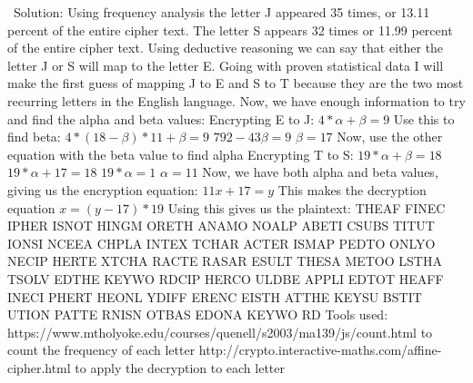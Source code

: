 \documentclass[12pt,letterpaper,final]{report}
\begin{document}
\indent\ Solution: Using frequency analysis the letter J appeared 35 times, or 13.11 percent of the entire cipher text. The letter S appears 32 times or 11.99 percent of the entire cipher text. Using deductive reasoning we can say that either the letter J or S will map to the letter E. Going with proven statistical data I will make the first guess of mapping J to E and S to T because they are the two most recurring letters in the English language. 
Now, we have enough information to try and find the alpha and beta values:
Encrypting E to J: $4*\alpha + \beta = 9$
Use this to find beta: $4*(18-\beta)*11+\beta = 9$
$792 -43\beta = 9$
$\beta = 17$
Now, use the other equation with the beta value to find alpha
Encrypting T to S: $19*\alpha + \beta = 18$
$19*\alpha + 17 = 18$
$19*\alpha = 1$
$\alpha = 11$
Now, we have  both alpha and beta values, giving us the encryption equation: $11x + 17 = y$ 
This makes the decryption equation $x = (y - 17)*19$
Using this gives us the plaintext:
THEAF FINEC IPHER ISNOT HINGM ORETH ANAMO NOALP ABETI CSUBS TITUT IONSI NCEEA CHPLA INTEX TCHAR ACTER ISMAP PEDTO ONLYO NECIP HERTE XTCHA RACTE RASAR ESULT THESA METOO LSTHA TSOLV EDTHE KEYWO RDCIP HERCO ULDBE APPLI EDTOT HEAFF INECI PHERT HEONL YDIFF ERENC EISTH ATTHE KEYSU BSTIT UTION PATTE RNISN OTBAS EDONA KEYWO RD
Tools used: 
https://www.mtholyoke.edu/courses/quenell/s2003/ma139/js/count.html to count the frequency of each letter
http://crypto.interactive-maths.com/affine-cipher.html to apply the decryption to each letter
\end{document}

